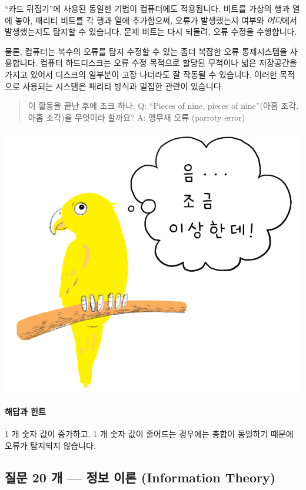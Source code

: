 \documentclass[]{article}
\begin{document}
``카드 뒤집기''에 사용된 동일한 기법이 컴퓨터에도 적용됩니다. 비트를
가상의 행과 열에 놓아, 패리티 비트를 각 행과 열에 추가함으써, 오류가
발생했는지 여부와 \emph{어디}에서 발생했는지도 탐지할 수 있습니다. 문제
비트는 다시 되돌려, 오류 수정을 수행합니다.

물론, 컴퓨터는 복수의 오류를 탐지 수정할 수 있는 좀더 복잡한 오류
통제시스템을 사용합니다. 컴퓨터 하드디스크는 오류 수정 목적으로 할당된
무척이나 넓은 저장공간을 가지고 있어서 디스크의 일부분이 고장 나더라도
잘 작동될 수 있습니다. 이러한 목적으로 사용되는 시스템은 패리티 방식과
밀접한 관련이 있습니다.

\begin{quote}
이 활동을 끝난 후에 조크 하나. Q: ``Pieces of nine, pieces of
nine''(아홉 조각, 아홉 조각)을 무엇이라 할까요? A: 앵무새 오류 (parroty
error)
\end{quote}

\includegraphics{csunplugged/01-part/img/ch04-checksum/04-checksum-04-parrot.png}

\mbox{}\paragraph{해답과 힌트}\label{section-72}

1 개 숫자 값이 증가하고, 1 개 숫자 값이 줄어드는 경우에는 총합이
동일하기 때문에 오류가 탐지되지 않습니다.

\subsection{질문 20 개 --- 정보 이론 (Information
Theory)}\label{mdash---information-theory}
\end{document}

